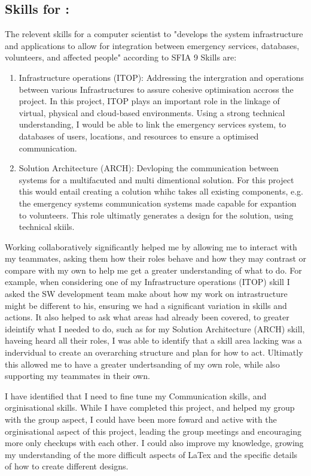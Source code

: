 \documentclass[a4paper, 11pt]{report}
\begin{document}
\subsection{Skills for \majA: \studA}

The relevent skills for a computer scientist to "develops the system infrastructure and applications to allow for integration between emergency services, databases, volunteers, and affected people" according to SFIA 9 Skills are:

\begin{enumerate}
    \item Infrastructure operations (ITOP): Addressing the intergration and operations between various Infrastructures to assure cohesive optimisation accross the project. In this project, ITOP plays an important role in the linkage of virtual, physical and cloud-based environments. Using a strong technical understanding, I  would be able to link the emergency services system, to databases of users, locations, and resources to ensure a optimised communication. 
    \item Solution Architecture (ARCH): Devloping the communication between systems for a multifacuted and multi dimentional solution. For this project this would entail creating a colution whihc takes all existing components, e.g. the emergency systems communication systems made capable for expantion to volunteers. This role ultimatly generates a design for the solution, using technical skiils. 
\end{enumerate}

Working collaboratively significantly helped me by allowing me to interact with my teammates, asking them how their roles behave and how they may contrast or compare with my own to help me get a greater understanding of what to do. For example, when considering one of my Infrastructure operations (ITOP) skill I asked the SW development team make about how my work on intrastructure might be different to his, ensuring we had a significant variation in skills and actions. It also helped to ask what areas had already been covered, to greater ideintify what I needed to do, such as for my Solution Architecture (ARCH) skill, haveing heard all their roles, I was able to identify that a skill area lacking was a indervidual to create an overarching structure and plan for how to act. Ultimatly this allowed me to have a greater undertsanding of my own role, while also  supporting my teammates in their own. 

I have identified that I need to fine tune my Communication skills, and orginisational skills. While I have completed this project, and helped my group with the group aspect, I could have been more foward and active with the orginisational aspect of this project, leading the group meetings and encouraging more only checkups with each other. I could also improve my knowledge, growing my understanding of the more difficult aspects of LaTex and the specific details of how to create different designs. 
\end{document}
